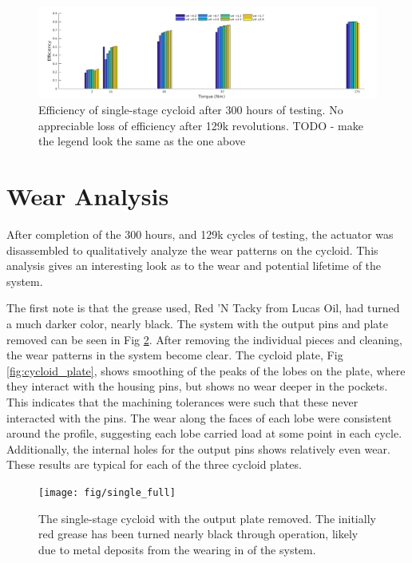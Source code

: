 \begin{figure}[h]
   \centering
   \includegraphics[width=0.8\linewidth]{fig/eff_final}
   \caption{Efficiency of single-stage cycloid after 300 hours of testing. No appreciable loss of efficiency after 129k revolutions. TODO - make the legend look the same as the one above }
   \label{fig:eff_results_final}
\end{figure}

\section{Wear Analysis} \label{ch:single:wear_analysis}

After completion of the 300 hours, and 129k cycles of testing, the actuator was disassembled to qualitatively analyze the wear patterns on the cycloid. This analysis gives an interesting look as to the wear and potential lifetime of the system. 

The first note is that the grease used, Red 'N Tacky from Lucas Oil, had turned a much darker color, nearly black. The system with the output pins and plate removed can be seen in Fig \ref{fig:single_full}. After removing the individual pieces and cleaning, the wear patterns in the system become clear. The cycloid plate, Fig \ref{fig:cycloid_plate}, shows smoothing of the peaks of the lobes on the plate, where they interact with the housing pins, but shows no wear deeper in the pockets. This indicates that the machining tolerances were such that these never interacted with the pins. The wear along the faces of each lobe were consistent around the profile, suggesting each lobe carried load at some point in each cycle. Additionally, the internal holes for the output pins shows relatively even wear. These results are typical for each of the three cycloid plates. 

\begin{figure}[t]
   \centering
   \texttt{[image: fig/single\_full]}
   \caption{The single-stage cycloid with the output plate removed. The initially red grease has been turned nearly black through operation, likely due to metal deposits from the wearing in of the system.}
   \label{fig:single_full}
\end{figure}

